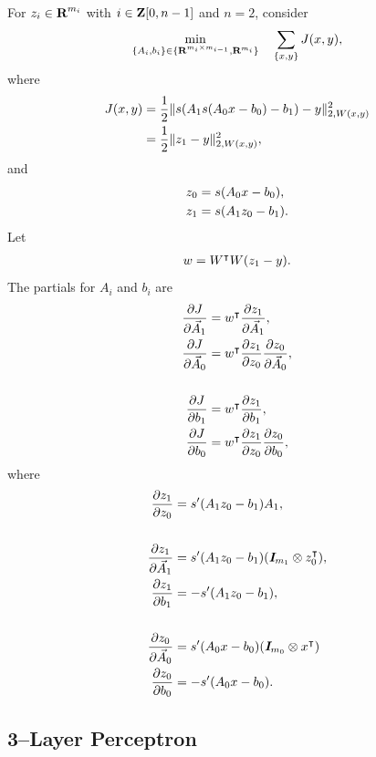 \documentclass{article}
\begin{document}
    For $z_i\in\textbf{R}^{m_i}$ with $i\in\textbf{Z}[0,n-1]$ and $n=2$, consider
    \begin{align*}
        \min_{\{A_i,b_i\}\in\{\textbf{R}^{m_i\times m_{i-1}},\textbf{R}^{m_i}\}}\quad 
        \sum_{\{x,y\}}
        J (x,y),
    \end{align*}
    where
    \begin{align*}
        J(x,y)&=\frac{1}{2}\|s(A_1s(A_0x -b_0)-b_1)-y \|_{2,W(x,y)}^2\\
        &=\frac{1}{2}\|z_1-y \|_{2,W(x,y)}^2,        
    \end{align*}
    and
    \begin{align*}
        z_0&=s(A_0x -b_0),\\
        z_1&=s(A_1z_0-b_1).
    \end{align*}
    Let
    \begin{align*}
        w=W^\intercal W (z_1-y ).
    \end{align*}
    The partials for $A_i$ and $b_i$ are
    \begin{align*}
        \frac{\partial  J }{\partial \vec{A}_1}&=w^\intercal  \frac{\partial z_1}{\partial \vec{A}_1},\\
        \frac{\partial  J }{\partial \vec{A}_0}&=w^\intercal  \frac{\partial z_1}{\partial z_0}\frac{\partial z_0 }{\partial \vec{A}_0},\\
        \\
        \frac{\partial  J }{\partial b_1}&=w^\intercal  \frac{\partial z_1}{\partial b_1},\\
        \frac{\partial  J }{\partial b_0}&=w^\intercal  \frac{\partial z_1}{\partial z_0}\frac{\partial z_0 }{\partial b_0},
    \end{align*}
    where
    \begin{align*}
        \frac{\partial z_1}{\partial z_0}&=s'(A_1z_0 -b_1)A_1,\\\\
        \frac{\partial z_1}{\partial \vec{A}_1}&=s'(A_1z_0 -b_1)(\emph{\textbf{I}}_{m_1}\otimes z_0 ^\intercal),\\
        \frac{\partial z_1}{\partial b_1}&=-s'(A_1z_0 -b_1),\\\\
        \frac{\partial z_0}{\partial \vec{A}_0}&=s'(A_0x -b_0)( \emph{\textbf{I}}_{m_0} \otimes x ^\intercal)\\
        \frac{\partial z_0}{\partial b_0}&=-s'(A_0x -b_0).
    \end{align*}
    
\subsection{3--Layer Perceptron}\label{sec:nn3}
\end{document}
